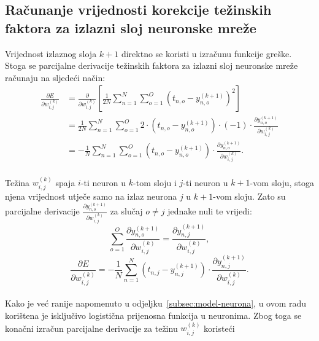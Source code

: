\subsection{Računanje vrijednosti korekcije težinskih faktora za izlazni sloj neuronske mreže}
\label{subsec:racunanje-vrijednosti-korekcije-tezinskih-faktora-za-izlazni-sloj-neuronske-mreze}
Vrijednost izlaznog sloja $k + 1$ direktno se koristi u izračunu funkcije greške. Stoga se parcijalne derivacije
težinskih faktora za izlazni sloj neuronske mreže računaju na sljedeći način:\\
\begin{align}
    \frac{\partial E}{\partial w_{i, j}^{(k)}} & = \frac{\partial}{\partial w_{i, j}^{(k)}} \left[\frac{1}{2N}
    \sum_{n = 1}^{N} \sum_{o = 1}^{O} \left(t_{n, o} - y_{n, o}^{(k + 1)}\right)^2\right]\\
    & = \frac{1}{2N} \sum_{n = 1}^{N} \sum_{o = 1}^{O} 2 \cdot \left(t_{n, o} - y_{n, o}^{(k + 1)}\right) \cdot (-1)
    \cdot \frac{\partial y_{n, o}^{(k + 1)}}{\partial w_{i, j}^{(k)}}\\
    & = -\frac{1}{N} \sum_{n = 1}^{N} \sum_{o = 1}^{O} \left(t_{n, o} - y_{n, o}^{(k + 1)}\right) \cdot
    \frac{\partial y_{n, o}^{(k + 1)}}{\partial w_{i, j}^{(k)}}.\label{eq:error-partial-1}
\end{align}\\
Težina $w_{i, j}^{(k)}$ spaja $i$-ti neuron u $k$-tom sloju i $j$-ti neuron u $k + 1$-vom sloju, stoga njena vrijednost
utječe samo na izlaz neurona $j$ u $k + 1$-vom sloju. Zato su parcijalne derivacije
$\frac{\partial y_{n, o}^{(k + 1)}}{\partial w_{i, j}^{(k)}}$ za slučaj $o \neq j$ jednake nuli te vrijedi:\\
\begin{equation}
    \sum_{o = 1}^{O} \frac{\partial y_{n, o}^{(k + 1)}}{\partial w_{i, j}^{(k)}} =
    \frac{\partial y_{n, j}^{(k + 1)}}{\partial w_{i, j}^{(k)}},\label{eq:y-partial-w-1}
\end{equation}
\begin{equation}
    \frac{\partial E}{\partial w_{i, j}^{(k)}} = -\frac{1}{N} \sum_{n = 1}^{N} \left(t_{n, j} - y_{n, j}^{(k + 1)}
    \right) \cdot \frac{\partial y_{n, j}^{(k + 1)}}{\partial w_{i, j}^{(k)}}.\label{eq:error-simplification}
\end{equation}\\
Kako je već ranije napomenuto u odjeljku\ \ref{subsec:model-neurona}, u ovom radu korištena je isključivo logistična
prijenosna funkcija u neuronima. Zbog toga se konačni izračun parcijalne derivacije za težinu $w_{i, j}^{(k)}$ koristeći
